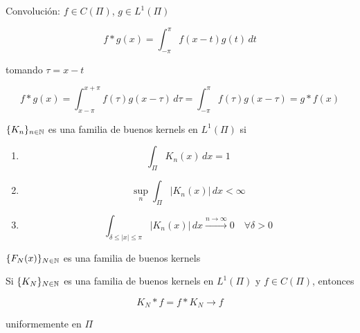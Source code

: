 Convolución: $f\in C(\Pi)$, $g\in L^1(\Pi)$

\[f*g(x)=\int_{-\pi}^\pi f(x-t)g(t)\,dt\]

tomando $\tau=x-t$

\[f*g(x)=\int_{x-\pi}^{x+\pi} f(\tau)g(x-\tau)\,d\tau=\int_{-\pi}^\pi f(\tau) g(x-\tau)=g*f(x)\]

\begin{fdefinition}
    $\{K_n\}_{n\in\mathbb{N}}$ es una familia de buenos kernels en $L^1(\Pi)$ si

    \begin{enumerate}
        \item \[\int_\Pi K_n(x)\,dx=1\]
        \item \[\sup_n \int_\Pi |K_n(x)|\,dx<\infty\]
        \item \[\int_{\delta\leq |x|\leq \pi} |K_n(x)|\,dx \xrightarrow{n\to\infty} 0\quad \forall \delta >0\]
    \end{enumerate}
\end{fdefinition}

\begin{fnote}
    $\{F_N(x)\}_{N\in\mathbb{N}}$ es una familia de buenos kernels
\end{fnote}

\begin{ftheorem}
    Si $\{K_N\}_{N\in\mathbb{N}}$ es una familia de buenos kernels en $L^1(\Pi)$ y $f\in C(\Pi)$, entonces 

    \[K_N*f=f*K_N\to f\]

    uniformemente en $\Pi$
\end{ftheorem}

